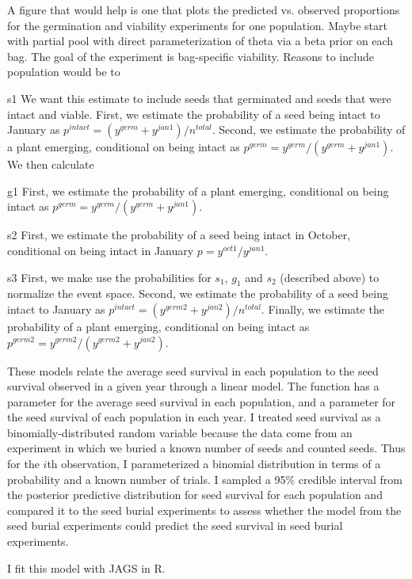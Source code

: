 \documentclass[12pt, oneside, titlepage]{article}   	%
\begin{document}
A figure that would help is one that plots the predicted vs. observed proportions for the germination and viability experiments for one population. 
 Maybe start with partial pool with direct parameterization of theta via a beta prior on each bag. The goal of the experiment is bag-specific viability. Reasons to include population would be to
 
 s1 We want this estimate to include seeds that germinated and seeds that were intact and viable. First, we estimate the probability of a seed being intact to January as $p^{intact} = (y^{germ}+y^{jan1})/n^{total}$. Second, we estimate the probability of a plant emerging, conditional on being intact as $p^{germ} = y^{germ}/(y^{germ}+y^{jan1})$. We then calculate 

g1 First, we estimate the probability of a plant emerging, conditional on being intact as $p^{germ} = y^{germ}/(y^{germ}+y^{jan1})$. 

s2 First, we estimate the probability of a seed being intact in October, conditional on being intact in January $ p = y^{oct1} / y^{jan1} $.

s3  First, we make use the probabilities for $s_1$, $g_1$ and $s_2$ (described above) to normalize the event space. Second, we estimate the probability of a seed being intact to January as $p^{intact} = (y^{germ2}+y^{jan2})/n^{total}$. Finally, we estimate the probability of a plant emerging, conditional on being intact as $p^{germ2} = y^{germ2}/(y^{germ2}+y^{jan2})$. 

These models relate the average seed survival in each population to the seed survival observed in a given year through a linear model. The function has a parameter for the average seed survival in each population, and a parameter for the seed survival of each population in each year. I treated seed survival as a binomially-distributed random variable because the data come from an experiment in which we buried a known number of seeds and counted seeds. Thus for the $i$th observation, I parameterized a binomial distribution in terms of a probability and a known number of trials. I sampled a 95\% credible interval from the posterior predictive distribution for seed survival for each population and compared it to the seed burial experiments to assess whether the model from the seed burial experiments could predict the seed survival in seed burial experiments. 

I fit this model with JAGS in R. %
\end{document}
